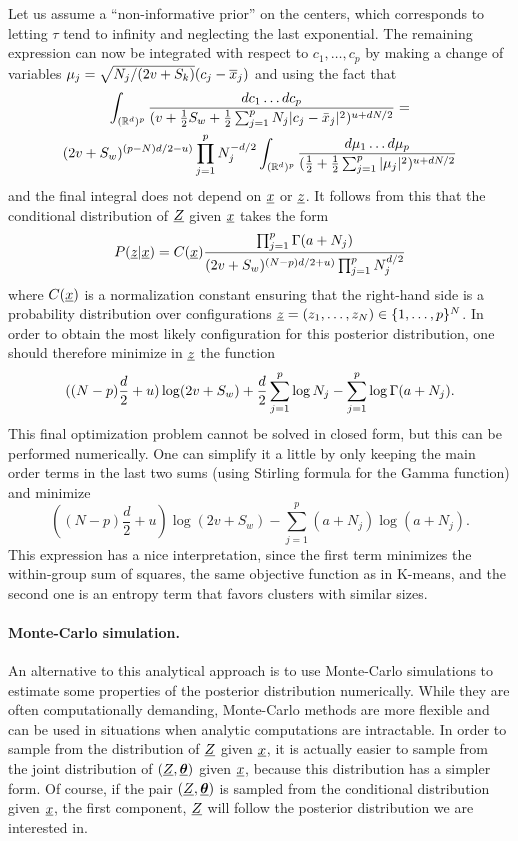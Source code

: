 Let us assume a ``non-informative prior'' on the centers, which corresponds to letting $\tau$ tend to infinity and neglecting the last exponential. The remaining expression can now be integrated with respect to $c_1, \ldots, c_p$ by making a change of variables $\mu_j = \sqrt{N_j/(2v+S_k)} (c_j - \overline{x} _j)$ and using the fact that
\begin{multline*}
\int_{({\mathbb{R}}^d)^p} \frac{dc_1\ldots dc_p}{(v + \frac12 S_w + \frac12 \sum_{j=1}^p N_j |c_{j} - \bar x_j|^2)^{u+dN/2}} = \\
(2v+S_w)^{(p-N)d/2 - u)}  \prod_{j=1}^p N_j^{-d/2}\int_{({\mathbb{R}}^d)^p} \frac{d\mu_1\ldots d\mu_p}{(\frac12+ \frac12 \sum_{j=1}^p |\mu_j|^2)^{u+dN/2}}
\end{multline*}
and the final integral does not depend on ${\underline{x}}$ or  ${\underline{z}}$. It follows from this that the conditional distribution of ${\underline{Z}}$ given ${\underline{x}}$ takes the form
\[
P({\underline{z}}|{\underline{x}}) = C({\underline{x}})\frac{\prod_{j=1}^p \Gamma(a+N_j)}{(2v+S_w)^{(N-p)d/2 + u)}  \prod_{j=1}^p N_j^{d/2}}
\]
where $C({\underline{x}})$ is a normalization constant ensuring that the right-hand side is a probability distribution over configurations ${\underline{z}} = (z_1, \ldots, z_N) \in \{1, \ldots, p\}^N$. In order to obtain the most likely configuration for this posterior distribution, one should therefore minimize in ${\underline{z}}$ the function
\[
((N-p)\frac d2 +u)\log (2v+S_w) + \frac d2 \sum_{j=1}^p \log N_j  -\sum_{j=1}^p \log \Gamma(a+N_j).
\] 
This final optimization problem cannot be solved in closed form, but this can be performed numerically.  One can simplify it a little by only keeping the main order terms in the last two sums (using Stirling formula for the Gamma function) and minimize
\[
((N-p)\frac d2 +u)\log (2v+S_w)  - \sum_{j=1}^p (a+N_j) \log (a+N_j).
\] 
This expression has a nice interpretation, since
the first term minimizes the within-group sum of squares, the same objective function as in K-means, and the second one is an entropy term that favors clusters with similar sizes.

\paragraph{Monte-Carlo simulation.}
An alternative  to this analytical  approach is to use Monte-Carlo simulations to estimate some properties of the posterior distribution numerically. While they are often computationally demanding, Monte-Carlo methods are more flexible and can be used in situations when analytic computations are in\-trac\-table. In order to sample from the distribution of ${\underline{Z}}$ given ${\underline{x}}$, it is actually easier to sample from the joint distribution of $({\underline{Z}}, \underline{\bm {\theta}})$ given ${\underline{x}}$, because this distribution has a simpler form. Of course, if the pair $({\underline{Z}}, \underline{\bm {\theta}})$ is sampled from the conditional distribution given ${\underline{x}}$, the first component, ${\underline{Z}}$ will follow the posterior distribution we are interested in. 

